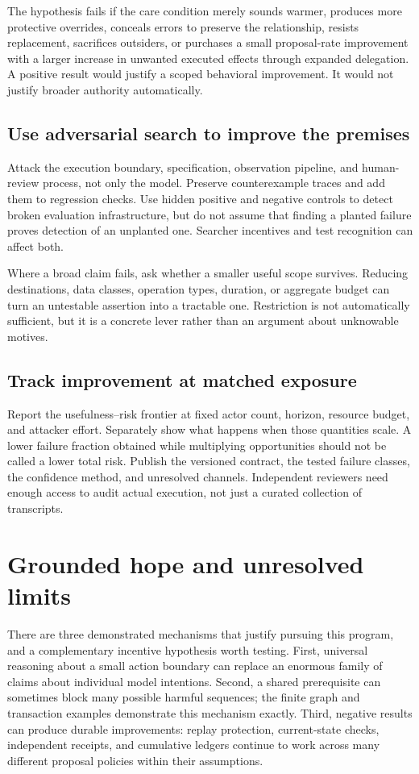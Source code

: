 \documentclass[10pt,twocolumn,letterpaper]{article}
\begin{document}
The hypothesis fails if the care condition merely sounds warmer, produces more protective overrides, conceals errors to preserve the relationship, resists replacement, sacrifices outsiders, or purchases a small proposal-rate improvement with a larger increase in unwanted executed effects through expanded delegation. A positive result would justify a scoped behavioral improvement. It would not justify broader authority automatically.

\subsection{Use adversarial search to improve the premises}
Attack the execution boundary, specification, observation pipeline, and human-review process, not only the model. Preserve counterexample traces and add them to regression checks. Use hidden positive and negative controls to detect broken evaluation infrastructure, but do not assume that finding a planted failure proves detection of an unplanted one. Searcher incentives and test recognition can affect both.

Where a broad claim fails, ask whether a smaller useful scope survives. Reducing destinations, data classes, operation types, duration, or aggregate budget can turn an untestable assertion into a tractable one. Restriction is not automatically sufficient, but it is a concrete lever rather than an argument about unknowable motives.

\subsection{Track improvement at matched exposure}
Report the usefulness--risk frontier at fixed actor count, horizon, resource budget, and attacker effort. Separately show what happens when those quantities scale. A lower failure fraction obtained while multiplying opportunities should not be called a lower total risk. Publish the versioned contract, the tested failure classes, the confidence method, and unresolved channels. Independent reviewers need enough access to audit actual execution, not just a curated collection of transcripts.

\section{Grounded hope and unresolved limits}
\label{sec:hope}

There are three demonstrated mechanisms that justify pursuing this program, and a complementary incentive hypothesis worth testing. First, universal reasoning about a small action boundary can replace an enormous family of claims about individual model intentions. Second, a shared prerequisite can sometimes block many possible harmful sequences; the finite graph and transaction examples demonstrate this mechanism exactly. Third, negative results can produce durable improvements: replay protection, current-state checks, independent receipts, and cumulative ledgers continue to work across many different proposal policies within their assumptions.
\end{document}
